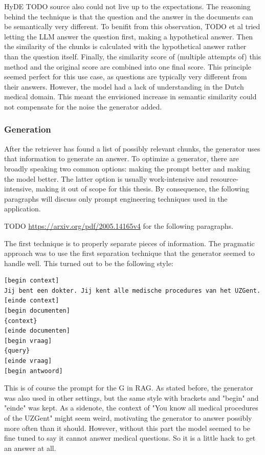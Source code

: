 HyDE TODO source also could not live up to the expectations. The reasoning behind the technique is that the question and the answer in the documents can be semantically very different. To benifit from this observation, TODO et al tried letting the LLM answer the question first, making a hypothetical answer. Then the similarity of the chunks is calculated with the hypothetical answer rather than the question itself. Finally, the similarity score of (multiple attempts of) this method and the original score are combined into one final score. This principle seemed perfect for this use case, as questions are typically very different from their answers. However, the model had a lack of understanding in the Dutch medical domain. This meant the envisioned increase in semantic similarity could not compensate for the noise the generator added.

\subsubsection{Generation}
After the retriever has found a list of possibly relevant chunks, the generator uses that information to generate an answer. To optimize a generator, there are broadly speaking two common options: making the prompt better and making the model better. The latter option is usually work-intensive and resource-intensive, making it out of scope for this thesis. By consequence, the following paragraphs will discuss only prompt engineering techniques used in the application.

TODO \url{https://arxiv.org/pdf/2005.14165v4} for the following paragraphs.

The first technique is to properly separate pieces of information. The pragmatic approach was to use the first separation technique that the generator seemed to handle well. This turned out to be the following style:
\begin{verbatim}
[begin context]
Jij bent een dokter. Jij kent alle medische procedures van het UZGent.
[einde context]
[begin documenten]
{context}
[einde documenten]
[begin vraag]
{query}
[einde vraag]
[begin antwoord]
\end{verbatim}
This is of course the prompt for the G in RAG. As stated before, the generator was also used in other settings, but the same style with brackets and "begin" and "einde" was kept. As a sidenote, the context of "You know all medical procedures of the UZGent" might seem weird, motivating the generator to answer possibly more often than it should. However, without this part the model seemed to be fine tuned to say it cannot answer medical questions. So it is a little hack to get an answer at all.


